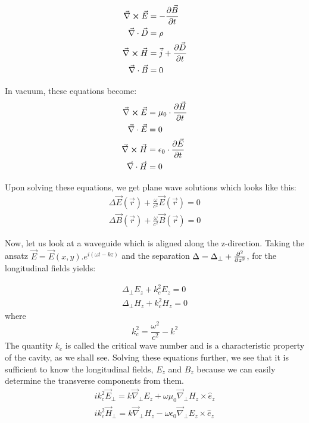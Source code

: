 \documentclass[a4paper]{report}
\numberwithin{equation}{section}
\begin{document}

\begin{align}
		\vec{\nabla} \cross \vec{E} &= - \pdv{\vec{B}}{t} \\
		\vec{\nabla} \cdot \vec{D} &= \rho \\
		\vec{\nabla} \cross \vec{H} &= \vec{j} + \pdv{\vec{D}}{t} \\
		\vec{\nabla} \cdot \vec{B} &= 0 
\end{align}

In vacuum, these equations become: 
\begin{align}
		\vec{\nabla} \cross \vec{E} &= \mu_0 \cdot \pdv{\vec{H}}{t} \\ 
		\vec{\nabla} \cdot \vec{E} &= 0 \\
		\vec{\nabla} \cross \vec{H} &= \epsilon_{0} \cdot \pdv{\vec{E}}{t} \\
		\vec{\nabla} \cdot \vec{H} &= 0
\end{align}

Upon solving these equations, we get plane wave solutions which looks like this: 
\begin{align*}
		\Delta \vec{E}\left(\vec{r}\right) + \frac{\omega}{c^2} \vec{E}\left(\vec{r}\right) = 0 \\
		\Delta \vec{B}\left(\vec{r}\right) + \frac{\omega}{c^2} \vec{B}\left(\vec{r}\right) = 0 
\end{align*}

Now, let us look at a waveguide which is aligned along the z-direction. Taking
the ansatz $\vec{E} = \vec{E}(x,y).e^{i(\omega t -kz)}$ and the separation
$\Delta = \Delta_{\perp} + \pdv[2]{}{z}$, for the longitudinal fields yields: 

\begin{align}
		\Delta_{\perp}E_{z} + k_{c}^2 E_{z} = 0 \\
		\Delta_{\perp}H_{z} + k_{c}^2 H_{z} = 0 
\end{align}
where 
\[
		k_{c}^2 = \frac{\omega^2 }{c^2 } - k^2   
\]
The quantity $k_{c} $ is called the critical wave number and is a characteristic
property of the cavity, as we shall see. Solving these equations further, we see
that it is sufficient to know the longitudinal fields, $E_{z} $ and $B_{z} $
because we can easily determine the transverse components from them. 
\begin{align} 
		ik_{c}^2 \vec{E}_{\perp} = k \vec{\nabla}_{\perp}E_{z} + \omega \mu _{0} \vec{\nabla}_{\perp}H_{z} \times \hat{e}_{z} \label{trans1} \\
		ik_{c}^2 \vec{H}_{\perp} = k \vec{\nabla}_{\perp}H_{z} - \omega \epsilon_{0} \vec{\nabla}_{\perp} E_{z} \times \hat{e}_{z} \label{trans2}     
\end{align}
\end{document}
